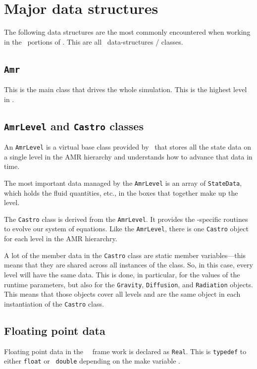 \section{Major data structures}

The following data structures are the most commonly encountered when
working in the \cpp\ portions of \castro.  This are all
\boxlib\ data-structures / classes.

\subsection{{\tt Amr}}

This is the main class that drives the whole simulation.  This is
the highest level in \castro.


\subsection{{\tt AmrLevel} and {\tt Castro} classes}

An {\tt AmrLevel} is a virtual base class provided by \boxlib\ that
stores all the state data on a single level in the AMR hierarchy and
understands how to advance that data in time.

The most important data managed by the {\tt AmrLevel} is an array of
{\tt StateData}, which holds the fluid quantities, etc., in the boxes
that together make up the level.

The {\tt Castro} class is derived from the {\tt AmrLevel}.  It provides
the \castro-specific routines to evolve our system of equations.  Like
the {\tt AmrLevel}, there is one {\tt Castro} object for each level in the
AMR hierarchry.

A lot of the member data in the {\tt Castro} class are static member
variables---this means that they are shared across all instances of
the class.  So, in this case, every level will have the same data.
This is done, in particular, for the values of the runtime parameters,
but also for the {\tt Gravity}, {\tt Diffusion}, and {\tt Radiation}
objects.  This means that those objects cover all levels and are the
same object in each instantiation of the {\tt Castro} class.

\subsection{Floating point data}

Floating point data in the \cpp\ \boxlib\ frame work is declared as
{\tt Real}.  This is {\tt typedef} to either {\tt float} or {\tt
  double} depending on the make variable .

